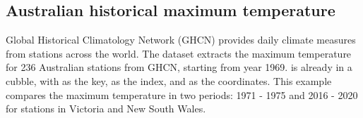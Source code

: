 \documentclass{article}
\newenvironment{Shaded}{\begin{snugshade}}{\end{snugshade}}
\newcommand{\AttributeTok}[1]{\textcolor[rgb]{0.77,0.63,0.00}{#1}}
\newcommand{\FunctionTok}[1]{\textcolor[rgb]{0.00,0.00,0.00}{#1}}
\newcommand{\NormalTok}[1]{#1}
\newcommand{\OtherTok}[1]{\textcolor[rgb]{0.56,0.35,0.01}{#1}}
\newcommand{\SpecialCharTok}[1]{\textcolor[rgb]{0.00,0.00,0.00}{#1}}
\newcommand{\StringTok}[1]{\textcolor[rgb]{0.31,0.60,0.02}{#1}}
\begin{document}
\begin{Shaded}
\end{Shaded}

\hypertarget{australian-historical-maximum-temperature}{%
\subsection{Australian historical maximum temperature}\label{australian-historical-maximum-temperature}}

Global Historical Climatology Network (GHCN) provides daily climate measures from stations across the world. The dataset  extracts the maximum temperature for 236 Australian stations from GHCN, starting from year 1969.  is already in a cubble, with  as the key,  as the index, and  as the coordinates. This example compares the maximum temperature in two periods: 1971 - 1975 and 2016 - 2020 for stations in Victoria and New South Wales.
\end{document}
